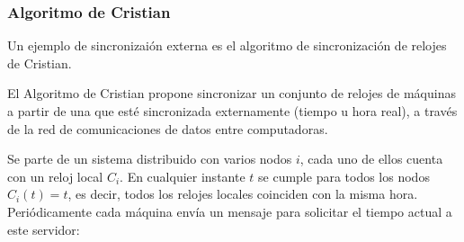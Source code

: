 		
		
		\subsubsection{Algoritmo de Cristian}
			

			Un ejemplo de sincronizai\'on externa es el algoritmo de sincronizaci\'on de relojes de Cristian.
			
		El Algoritmo de Cristian \cite{Cristian1989}  propone sincronizar un conjunto de relojes de 	máquinas a partir de una que esté sincronizada externamente (tiempo u hora real), a través de la red de comunicaciones de datos entre computadoras. 
	
	 Se parte de un sistema distribuido con varios nodos $i$, cada uno de ellos cuenta con un reloj local $C_{i}$. En cualquier instante $t$ se cumple para todos los nodos $C_{i}(t) = t$, es decir, todos los relojes locales coinciden con  la misma hora.   Periódicamente cada máquina envía un mensaje para solicitar el tiempo actual a este servidor:
		
		
		 

